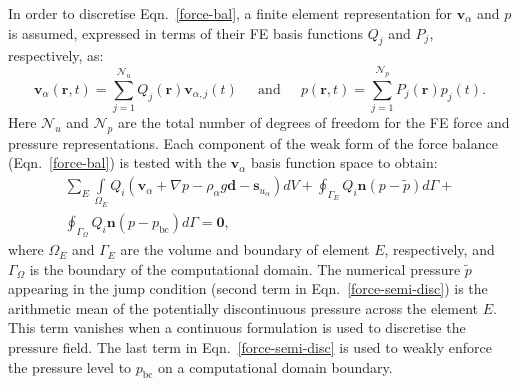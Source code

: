 \documentclass[times]{fldauth}
\begin{document}
In order to discretise Eqn.~\ref{force-bal}, a finite element
representation for $\mathbf{v}_\alpha$ and $p$ is assumed, expressed
in terms of their FE basis functions $Q_{j}$ and $P_{j}$,
respectively, as:
\begin{equation}
  \mathbf{v}_\alpha(\bm{r},t) = \sum\limits_{j=1}^{\mathcal{N}_u}
  Q_{j}(\bm{r})\mathbf{v}_{\alpha,j}(t) \;\;\;\;\text{ and } \;\;\;\;
  p(\bm{r},t) = \sum\limits_{j=1}^{\mathcal{N}_p}
  P_{j}(\bm{r})p_{j}(t).
\end{equation} 
Here $\mathcal{N}_{u}$ and $\mathcal{N}_{p}$ are the total number of
degrees of freedom for the FE force and pressure representations. Each
component of the weak form of the force balance (Eqn.~\ref{force-bal})
is tested with the $\mathbf{v}_\alpha$ basis function space to obtain:
\begin{eqnarray}
  \sum\limits_{E} \left. \int\limits_{\Omega_E} { {Q}}_i \left (
             {\mathbf v}_\alpha + \nabla p  -\rho_\alpha g \mathbf{d} -{\mathbf s}_{u_\alpha}
             \right) dV \right. + \displaystyle \oint_{\Gamma_{E}}
                   {Q}_i {\mathbf n} \left(p - \tilde{p}\right)
                   d\Gamma + \nonumber \\ \oint_{\Gamma_{\Omega}} {
                     Q}_i {\mathbf n} \left(p - p_\text{bc}\right) d\Gamma
                   = \bm{0},
                   \label{force-semi-disc} 
\end{eqnarray} 
where $\Omega_E$ and $\Gamma_{E}$ are the volume and boundary of
element $E$, respectively, and $\Gamma_{\Omega}$ is the boundary of
the computational domain. The numerical pressure $\tilde{p}$ appearing
in the jump condition (second term in Eqn.~\ref{force-semi-disc}) is
the arithmetic mean of the potentially discontinuous pressure across
the element $E$. This term vanishes when a continuous formulation is
used to discretise the pressure field. The last term in
Eqn.~\ref{force-semi-disc} is used to weakly enforce the pressure
level to $p_\text{bc}$ on a computational domain boundary.
\end{document}
